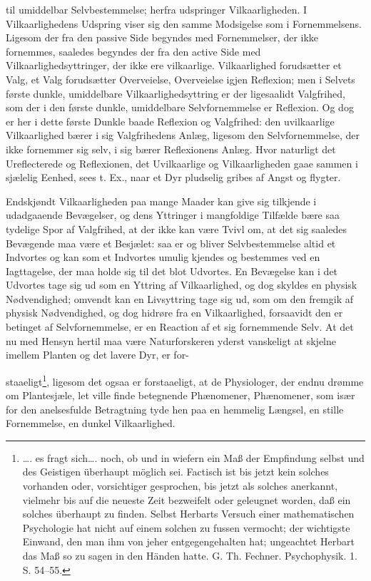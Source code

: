 \documentclass[12pt,a4paper]{book}
\begin{document}
til umiddelbar Selvbestemmelse; herfra udspringer Vilkaarligheden. I
Vilkaarlighedens Udspring viser sig den samme Modsigelse som i Fornemmelsens.
Ligesom der fra den passive Side begyndes med Fornemmelser, der ikke fornemmes,
saaledes begyndes der fra den active Side med Vilkaarlighedsyttringer, der ikke
ere vilkaarlige. Vilkaarlighed forudsætter et Valg, et Valg forudsætter
Overveielse, Overveielse igjen Reflexion; men i Selvets første dunkle,
umiddelbare Vilkaarlighedsyttring er der ligesaalidt Valgfrihed, som der i den
første dunkle, umiddelbare Selvfornemmelse er Reflexion. Og dog er her i dette
første Dunkle baade Reflexion og Valgfrihed: den uvilkaarlige Vilkaarlighed
bærer i sig Valgfrihedens Anlæg, ligesom den Selvfornemmelse, der ikke
fornemmer sig selv, i sig bærer Reflexionens Anlæg. Hvor naturligt det
Ureflecterede og Reflexionen, det Uvilkaarlige og Vilkaarligheden gaae sammen i
sjælelig Eenhed, sees t. Ex., naar et Dyr pludselig gribes af Angst og flygter.

Endskjøndt Vilkaarligheden paa mange Maader kan give sig tilkjende i
udadgaaende Bevægelser, og dens Yttringer i mangfoldige Tilfælde bære saa
tydelige Spor af Valgfrihed, at der ikke kan være Tvivl om, at det sig saaledes
Bevægende maa være et Besjælet: saa er og bliver Selvbestemmelse altid et
Indvortes og kan som et Indvortes umulig kjendes og bestemmes ved en
Iagttagelse, der maa holde sig til det blot Udvortes. En Bevægelse kan i det
Udvortes tage sig ud som en Yttring af Vilkaarlighed, og dog skyldes en physisk
Nødvendighed; omvendt kan en Livsyttring tage sig ud, som om den fremgik af
physisk Nødvendighed, og dog hidrøre fra en Vilkaarlighed, forsaavidt den er
betinget af Selvfornemmelse, er en Reaction af et sig fornemmende Selv. At det
nu med Hensyn hertil maa være Naturforskeren yderst vanskeligt at skjelne
imellem Planten og det lavere Dyr, er for-

\setcounter{footnote}{0}
staaeligt\footnote{\ldots. es fragt sich\ldots. noch, ob und in wiefern ein Maß
der Empfindung selbst und des Geistigen überhaupt möglich sei. Factisch ist bis
jetzt kein solches vorhanden oder, vorsichtiger gesprochen, bis jetzt als
solches anerkannt, vielmehr bis auf die neueste Zeit bezweifelt oder geleugnet
worden, daß ein solches überhaupt zu finden. Selbst Herbarts Versuch einer
mathematischen Psychologie hat nicht auf einem solchen zu fussen vermocht; der
wichtigste Einwand, den man ihm von jeher entgegengehalten hat; ungeachtet
Herbart das Maß so zu sagen in den Händen hatte. G. Th. Fechner. Psychophysik.
1. S. 54--55.}, ligesom det ogsaa er forstaaeligt, at de Physiologer, der endnu
drømme om Plantesjæle, let ville finde betegnende Phænomener, Phænomener, som
især for den anelsesfulde Betragtning tyde hen paa en hemmelig Længsel, en
stille Fornemmelse, en dunkel Vilkaarlighed.
\end{document}
